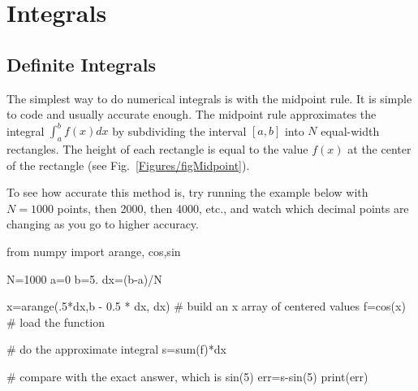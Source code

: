 \section{Integrals}

\subsection*{Definite Integrals}
 The simplest way to do numerical integrals is with the midpoint rule. It is simple to code and usually accurate enough. The midpoint rule approximates the integral $\int_a^b f(x) dx$ by subdividing the interval
$[a,b]$ into $N$ equal-width rectangles. The height of each rectangle is equal to the value $f(x)$ at the center of the rectangle (see Fig.~\ref{Figures/figMidpoint}).



To see how accurate this method is, try running the example below with $N=1000$ points, then
2000, then 4000, etc., and watch which decimal points are changing as you go
to higher accuracy.

\begin{codeexample}
\begin{VerbatimOut}{\listingFile}
from numpy import arange, cos,sin

N=1000
a=0
b=5.
dx=(b-a)/N

x=arange(.5*dx,b - 0.5 * dx, dx)  # build an x array of centered values
f=cos(x)  # load the function

# do the approximate integral
s=sum(f)*dx

# compare with the exact answer, which is sin(5)
err=s-sin(5)
print(err)
\end{VerbatimOut}
\end{codeexample}



